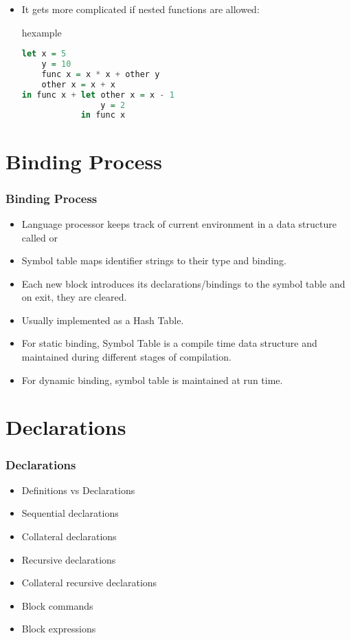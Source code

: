 \begin{frame}[fragile]
\begin{itemize}
\item It gets more complicated if nested functions are allowed:
\begin{beamercolorbox}{hexample}
\begin{lstlisting}[language=Haskell]
let x = 5
    y = 10
    func x = x * x + other y
    other x = x + x
in func x + let other x = x - 1
                y = 2
            in func x
\end{lstlisting}
\end{beamercolorbox}
\end{itemize}
\end{frame}

\section{Binding Process}
\begin{frame}
\frametitle{Binding Process}
\begin{itemize}
\item Language processor keeps track of current environment in a data structure called  or 
\item Symbol table maps identifier strings to their type and binding.
\item Each new block introduces its declarations/bindings to the symbol table and on exit, they are cleared.
\item Usually implemented as a Hash Table. 
\item For static binding, Symbol Table is a compile time data structure and maintained during different stages of compilation.
\item For dynamic binding, symbol table is maintained at run time.
\end{itemize}
\end{frame}

\section{Declarations}
\begin{frame}
\frametitle{Declarations}
\begin{itemize}
 \item Definitions vs Declarations
 \item Sequential declarations
 \item Collateral declarations
 \item Recursive declarations
 \item Collateral recursive declarations
 \item Block commands
 \item Block expressions
\end{itemize}
\end{frame}

